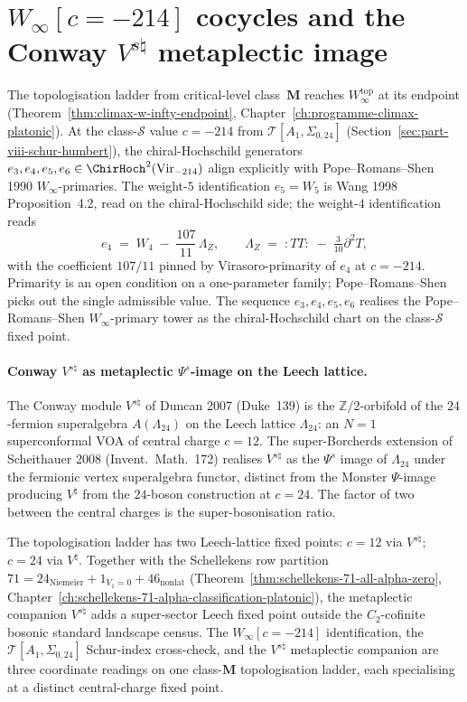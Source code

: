 \section{$W_\infty[c=-214]$ cocycles and the Conway $V^{s\natural}$
metaplectic image}
\label{sec:part-viii-winf-conway}

The topologisation ladder from critical-level class~$\mathbf{M}$
reaches $W_\infty^{\mathrm{top}}$ at its endpoint
(Theorem~\ref{thm:climax-w-infty-endpoint},
Chapter~\ref{ch:programme-climax-platonic}). At the class-$\mathcal{S}$
value $c = -214$ from $\mathcal{T}[A_1,\Sigma_{0,24}]$
(Section~\ref{sec:part-viii-schur-humbert}), the chiral-Hochschild
generators $e_3, e_4, e_5, e_6 \in \ChirHoch^2(\mathrm{Vir}_{-214})$
align explicitly with Pope--Romans--Shen 1990 $W_\infty$-primaries.
The weight-$5$ identification $e_5 = W_5$ is Wang 1998
Proposition~4.2, read on the chiral-Hochschild side; the weight-$4$
identification reads
\[
e_4
\;=\;
W_4 \;-\; \frac{107}{11}\,\Lambda_Z,
\qquad
\Lambda_Z
\;=\;
{:}TT{:}\;-\;\tfrac{3}{10}\partial^2 T,
\]
with the coefficient $107/11$ pinned by Virasoro-primarity of $e_4$
at $c = -214$. Primarity is an open condition on a one-parameter
family; Pope--Romans--Shen picks out the single admissible value. The
sequence $e_3, e_4, e_5, e_6$ realises the Pope--Romans--Shen
$W_\infty$-primary tower as the chiral-Hochschild chart on the
class-$\mathcal{S}$ fixed point.

\paragraph{Conway $V^{s\natural}$ as metaplectic $\Psi^s$-image on the
Leech lattice.}
The Conway module $V^{s\natural}$ of Duncan 2007 (Duke~139) is the
$\mathbb{Z}/2$-orbifold of the $24$-fermion superalgebra
$A(\Lambda_{24})$ on the Leech lattice $\Lambda_{24}$: an $N = 1$
superconformal VOA of central charge $c = 12$. The super-Borcherds
extension of Scheithauer 2008 (Invent.\ Math.\ 172) realises
$V^{s\natural}$ as the $\Psi^s$ image of $\Lambda_{24}$ under the
fermionic vertex superalgebra functor, distinct from the Monster
$\Psi$-image producing $V^\natural$ from the $24$-boson construction
at $c = 24$. The factor of two between the central charges is the
super-bosonisation ratio.

The topologisation ladder has two Leech-lattice fixed points:
$c = 12$ via $V^{s\natural}$; $c = 24$ via $V^\natural$. Together with
the Schellekens row partition
$71 = 24_{\mathrm{Niemeier}} + 1_{V_1=0} + 46_{\mathrm{nonlat}}$
(Theorem~\ref{thm:schellekens-71-all-alpha-zero},
Chapter~\ref{ch:schellekens-71-alpha-classification-platonic}), the
metaplectic companion $V^{s\natural}$ adds a super-sector Leech fixed
point outside the $C_2$-cofinite bosonic standard landscape census.
The $W_\infty[c = -214]$ identification, the
$\mathcal{T}[A_1,\Sigma_{0,24}]$ Schur-index cross-check, and the
$V^{s\natural}$ metaplectic companion are three coordinate readings on
one class-$\mathbf{M}$ topologisation ladder, each specialising at a
distinct central-charge fixed point.

